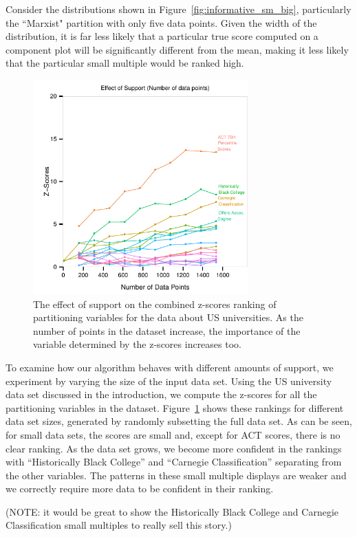 Consider the distributions shown in Figure~\ref{fig:informative_sm_big}, particularly the ``Marxist" partition with only five data points. Given the width of the distribution, it is far less likely that a particular true score computed on a component plot will be significantly different from the mean, making it less likely that the particular small multiple would be ranked high.
\begin{figure}
\centering
\includegraphics[width=3.25in,height=3.25in]{images/support-nogrid.pdf}
  \caption{The effect of support on the combined z-scores ranking of partitioning variables for the data about US universities. As the number of points in the dataset increase, the importance of the variable determined by the z-scores increases too. }
 \label{fig:support}
\end{figure}

To examine how our algorithm behaves with different amounts of support, we experiment by varying the size of the input data set. Using the US university data set discussed in the introduction, we compute the z-scores for all the partitioning variables in the dataset. Figure~\ref{fig:support} shows these rankings for different data set sizes, generated by randomly subsetting the full data set.
As can be seen, for small data sets, the scores are small and, except for ACT scores, there is no clear ranking. As the data set grows, we become more confident in the rankings with ``Historically Black College'' and ``Carnegie Classification'' separating from the other variables. The patterns in these small multiple displays are weaker and we correctly require more data to be confident in their ranking.

(NOTE: it would be great to show the Historically Black College and Carnegie Classification small multiples to really sell this story.) 

